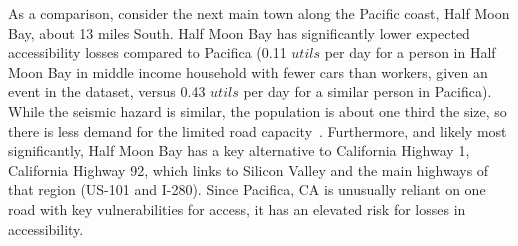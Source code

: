 As a comparison, consider the next main town along the Pacific coast, Half Moon Bay, about 13 miles South. Half Moon Bay has significantly lower expected accessibility losses compared to Pacifica (0.11 $utils$ per day for a person in Half Moon Bay in middle income household with fewer cars than workers, given an event in the dataset, versus 0.43 $utils$ per day for a similar person in Pacifica).%
While the seismic hazard is similar, the population is about one third the size, so there is less demand for the limited road capacity~\cite{u.s._bureau_of_the_census_united_2010}. Furthermore, and likely most significantly, Half Moon Bay has a key alternative to California Highway 1, California Highway 92, which links to Silicon Valley and the main highways of that region (US-101 and I-280). %
Since Pacifica, CA is unusually reliant on one road with key vulnerabilities for access, it has an elevated risk for losses in accessibility.





